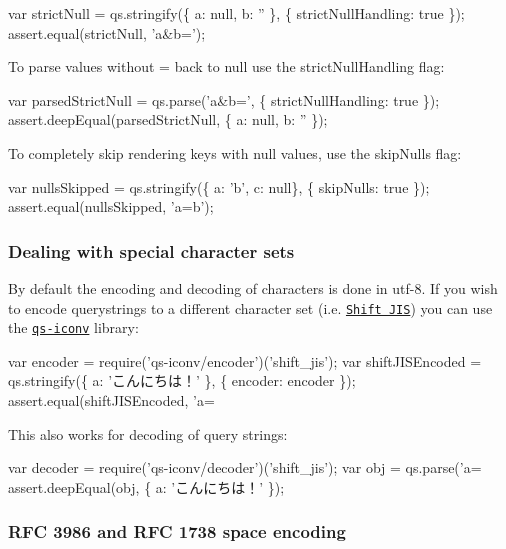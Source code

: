 \begin{DoxyCode}
var strictNull = qs.stringify(\{ a: null, b: '' \}, \{ strictNullHandling: true \});
assert.equal(strictNull, 'a&b=');
\end{DoxyCode}


To parse values without {\ttfamily =} back to {\ttfamily null} use the {\ttfamily strict\+Null\+Handling} flag\+:


\begin{DoxyCode}
var parsedStrictNull = qs.parse('a&b=', \{ strictNullHandling: true \});
assert.deepEqual(parsedStrictNull, \{ a: null, b: '' \});
\end{DoxyCode}


To completely skip rendering keys with {\ttfamily null} values, use the {\ttfamily skip\+Nulls} flag\+:


\begin{DoxyCode}
var nullsSkipped = qs.stringify(\{ a: 'b', c: null\}, \{ skipNulls: true \});
assert.equal(nullsSkipped, 'a=b');
\end{DoxyCode}


\subsubsection*{Dealing with special character sets}

By default the encoding and decoding of characters is done in {\ttfamily utf-\/8}. If you wish to encode querystrings to a different character set (i.\+e. \href{https://en.wikipedia.org/wiki/Shift_JIS}{\tt Shift J\+IS}) you can use the \href{https://github.com/martinheidegger/qs-iconv}{\tt {\ttfamily qs-\/iconv}} library\+:


\begin{DoxyCode}
var encoder = require('qs-iconv/encoder')('shift\_jis');
var shiftJISEncoded = qs.stringify(\{ a: 'こんにちは！' \}, \{ encoder: encoder \});
assert.equal(shiftJISEncoded, 'a=%
\end{DoxyCode}


This also works for decoding of query strings\+:


\begin{DoxyCode}
var decoder = require('qs-iconv/decoder')('shift\_jis');
var obj = qs.parse('a=%
assert.deepEqual(obj, \{ a: 'こんにちは！' \});
\end{DoxyCode}


\subsubsection*{R\+FC 3986 and R\+FC 1738 space encoding}

